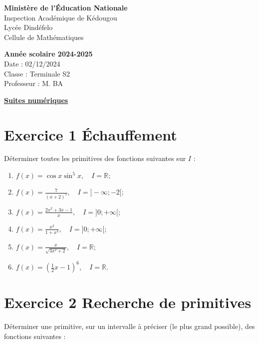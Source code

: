 \documentclass[12pt]{article}
\begin{document}
\noindent
\begin{minipage}[t]{0.48\textwidth}
\raggedright
\textbf{Ministère de l'Éducation Nationale}\\
Inspection Académique de Kédougou\\
Lycée Dindéfelo\\
Cellule de Mathématiques
\end{minipage}
\hfill
\begin{minipage}[t]{0.48\textwidth}
\raggedleft
\textbf{Année scolaire 2024-2025}\\
Date : 02/12/2024\\
Classe : Terminale S2\\
Professeur : M. BA
\end{minipage}
\begin{center}
\underline{\textbf{Suites numériques}}
\end{center}
\section*{Exercice 1 \quad Échauffement}

Déterminer toutes les primitives des fonctions suivantes sur \( I \) :

\begin{enumerate}
    \item[\textbf{a)}] \( f(x) = \cos x \sin^5 x, \quad I = \mathbb{R}; \)
    \item[\textbf{b)}] \( f(x) = \frac{7}{(x+2)^{5}}, \quad I = ]-\infty; -2[; \)
    \item[\textbf{c)}] \( f(x) = \frac{2x^{2}+3x-1}{x}, \quad I = ]0; +\infty[; \)
    \item[\textbf{d)}] \( f(x) = \frac{x^{2}}{1+x^{3}}, \quad I = ]0; +\infty[; \)
    \item[\textbf{e)}] \( f(x) = \frac{x}{\sqrt{3x^2 + 2}}, \quad I = \mathbb{R}; \)
    \item[\textbf{f)}] \( f(x) = \left( \frac{1}{2}x-1 \right)^6, \quad I = \mathbb{R}. \)
\end{enumerate}
\section*{Exercice 2 \quad Recherche de primitives}

Déterminer une primitive, sur un intervalle à préciser (le plus grand possible), des fonctions suivantes :
\end{document}
